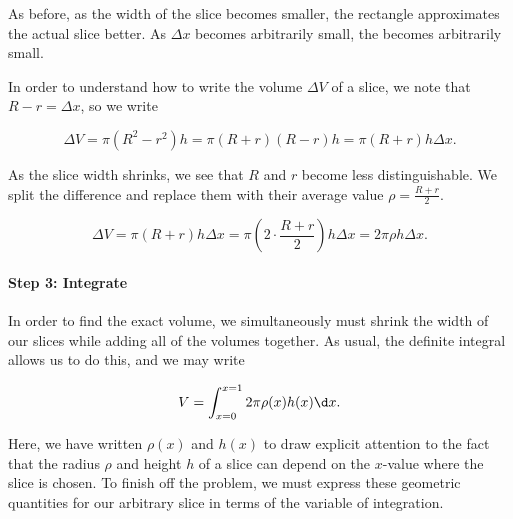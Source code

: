 \documentclass{ximera}
\begin{document}
\begin{model}
\begin{image}

            \end{image}
            
As before, as the width of the slice becomes smaller, the rectangle approximates the actual slice better.  As $\Delta x$ becomes arbitrarily small, the  becomes arbitrarily small.

In order to understand how to write the volume $\Delta V$ of a slice, we note that $R-r = \Delta x$, so we write

\[
\Delta V = \pi (R^2-r^2)h = \pi(R+r)(R-r)h = \pi(R+r)h \Delta x.
\] 

As the slice width shrinks, we see that $R$ and $r$ become less distinguishable.  We split the difference and replace them with their average value $\rho = \frac{R+r}{2}$.

\[
\Delta V = \pi (R+r)h \Delta x = \pi \left(2 \cdot \frac{R+r}{2} \right)h \Delta x  = 2\pi \rho h \Delta x.
\]        

\paragraph{Step 3: Integrate}
In order to find the exact volume, we simultaneously must shrink the width of our slices while adding all of the volumes together.  As usual, the definite integral allows us to do this, and we may write

\[
V= \int_{x=0}^{x=1} 2 \pi \rho(x) h(x) \d x .
\]    

Here, we have written $\rho(x)$ and $h(x)$ to draw explicit attention to the fact that the radius $\rho$ and height $h$ of a slice can depend  on the $x$-value where the slice is chosen. To finish off the problem, we must express these geometric quantities for our arbitrary slice in terms of the variable of integration.


\end{model}
\end{document}
